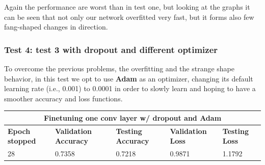 Again the performance are worst than in test one, but looking at the graphs it can be seen that not only our network overfitted very fast, but it forms also few fang-shaped changes in direction. 






\subsubsection{Test 4: test 3 with dropout and different optimizer}
To overcome the previous problems, the overfitting and the strange shape behavior, in this test we opt to use \textbf{Adam} as an optimizer, changing its default learning rate (i.e., 0.001) to 0.0001 in order to slowly learn and hoping to have a smoother accuracy and loss functions.

 
 \medskip

\begin{tabular}{ |p{2cm}|p{2cm}|p{2cm}|p{2cm}|p{2cm}|  }
\hline
\multicolumn{5}{|c|}{Finetuning one conv layer w/ dropout and Adam} \\
\hline
\textbf{Epoch stopped} & \textbf{Validation Accuracy} & \textbf{Testing Accuracy} & \textbf{Validation Loss} & \textbf{Testing Loss} \\
\hline
28 & 0.7358 & 0.7218 & 0.9871 & 1.1792\\
\hline
\end{tabular}

\medskip


